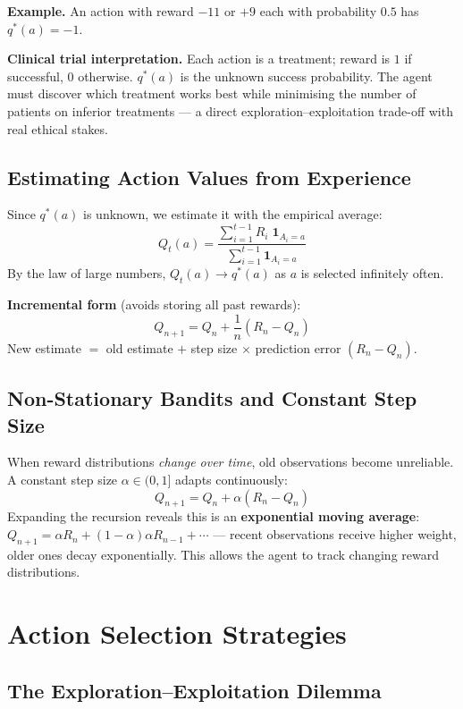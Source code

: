 \documentclass[11pt,a4paper]{article}
\newcommand{\term}[1]{\textcolor{DefGreen}{\textbf{#1}}}
\begin{document}
\textbf{Example.} An action with reward $-11$ or $+9$ each with probability $0.5$ has $q^*(a) = -1$.

\textbf{Clinical trial interpretation.} Each action is a treatment; reward is $1$ if successful, $0$ otherwise. $q^*(a)$ is the unknown success probability. The agent must discover which treatment works best while minimising the number of patients on inferior treatments --- a direct exploration--exploitation trade-off with real ethical stakes.

\subsection{Estimating Action Values from Experience}

Since $q^*(a)$ is unknown, we estimate it with the empirical average:
\[
Q_t(a) = \frac{\sum_{i=1}^{t-1} R_i\;\mathbf{1}_{A_i=a}}{\sum_{i=1}^{t-1} \mathbf{1}_{A_i=a}}
\]
By the law of large numbers, $Q_t(a) \to q^*(a)$ as $a$ is selected infinitely often.

\textbf{Incremental form} (avoids storing all past rewards):
\[
Q_{n+1} = Q_n + \frac{1}{n}(R_n - Q_n)
\]
New estimate $=$ old estimate $+$ step size $\times$ prediction error $(R_n - Q_n)$.

\subsection{Non-Stationary Bandits and Constant Step Size}

When reward distributions \emph{change over time}, old observations become unreliable. A constant step size $\alpha \in (0,1]$ adapts continuously:
\[
Q_{n+1} = Q_n + \alpha(R_n - Q_n)
\]
Expanding the recursion reveals this is an \term{exponential moving average}:
$Q_{n+1} = \alpha R_n + (1-\alpha)\alpha R_{n-1} + \cdots$ --- recent observations receive higher weight, older ones decay exponentially. This allows the agent to track changing reward distributions.

\section{Action Selection Strategies}

\subsection{The Exploration--Exploitation Dilemma}
\end{document}
